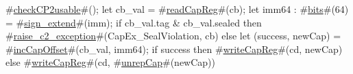 #\hyperref[sailMIPSzcheckCP2usable]{checkCP2usable}#();
let cb_val = #\hyperref[sailMIPSzreadCapReg]{readCapReg}#(cb);
let imm64 : #\hyperref[sailMIPSzbits]{bits}#(64) = #\hyperref[sailMIPSzsignzyextend]{sign\_extend}#(imm);
if cb_val.tag & cb_val.sealed then
  #\hyperref[sailMIPSzraisezyc2zyexception]{raise\_c2\_exception}#(CapEx_SealViolation, cb)
else
{
  let (success, newCap) = #\hyperref[sailMIPSzincCapOffset]{incCapOffset}#(cb_val, imm64);
  if success then
      #\hyperref[sailMIPSzwriteCapReg]{writeCapReg}#(cd, newCap)
  else
      #\hyperref[sailMIPSzwriteCapReg]{writeCapReg}#(cd, #\hyperref[sailMIPSzunrepCap]{unrepCap}#(newCap))
}
